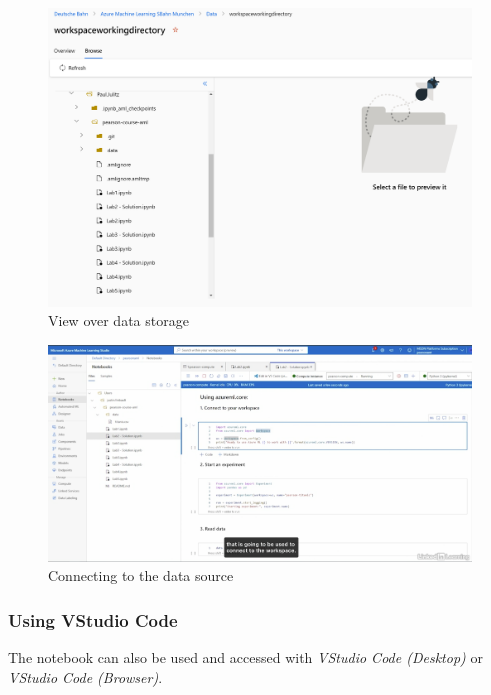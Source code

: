 \begin{figure}[H]
	\centering
	\includegraphics[scale = 0.3]{attachment/chapter_10/Scc045}
	\caption{View over data storage}
\end{figure}


\begin{figure}[H]
	\centering
	\includegraphics[scale = 0.3]{attachment/chapter_10/Scc044}
	\caption{Connecting to the data source}
\end{figure}

\subsubsection{Using VStudio Code}
The notebook can also be used and accessed with \textit{VStudio Code (Desktop)} or \textit{VStudio Code (Browser)}.

